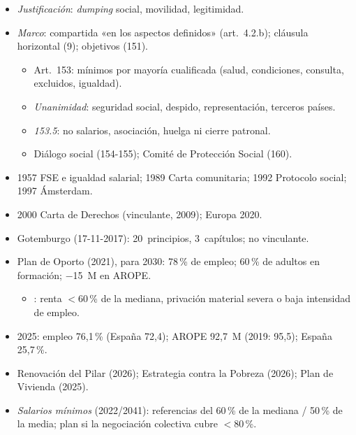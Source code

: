 \documentclass{article}
\begin{document}
\begin{columnas}
\begin{itemize}
\item \emph{Justificación}: \emph{dumping} social, movilidad, legitimidad.
\item \emph{Marco}: compartida «en los aspectos definidos» (art.~4.2.b); cláusula horizontal (9); objetivos (151).
  \begin{itemize}
  \item Art.~153: mínimos por mayoría cualificada (salud, condiciones, consulta, excluidos, igualdad).
  \item \emph{Unanimidad}: seguridad social, despido, representación, terceros países.
  \item \emph{153.5}: no salarios, asociación, huelga ni cierre patronal.
  \item Diálogo social (154-155); Comité de Protección Social (160).
  \end{itemize}
\end{itemize}
\begin{itemize}
\item 1957 FSE e igualdad salarial; 1989 Carta comunitaria; 1992 Protocolo social; 1997 Ámsterdam.
\item 2000 Carta de Derechos (vinculante, 2009); Europa 2020.
\end{itemize}
\begin{itemize}
\item Gotemburgo (17-11-2017): 20~principios, 3~capítulos; no vinculante.
\item Plan de Oporto (2021), para 2030: 78\,\% de empleo; 60\,\% de adultos en formación; $-$15~M en AROPE.
  \begin{itemize}
  \item {}: renta $<$60\,\% de la mediana, privación material severa o baja intensidad de empleo.
  \end{itemize}
\item 2025: empleo 76,1\,\% (España 72,4); AROPE 92,7~M (2019: 95,5); España 25,7\,\%.
\item Renovación del Pilar (2026); Estrategia contra la Pobreza (2026); Plan de Vivienda (2025).
\end{itemize}
\begin{itemize}
\item \emph{Salarios mínimos} (2022/2041): referencias del 60\,\% de la mediana / 50\,\% de la media; plan si la negociación colectiva cubre $<$80\,\%.

\end{itemize}
\end{columnas}
\end{document}

